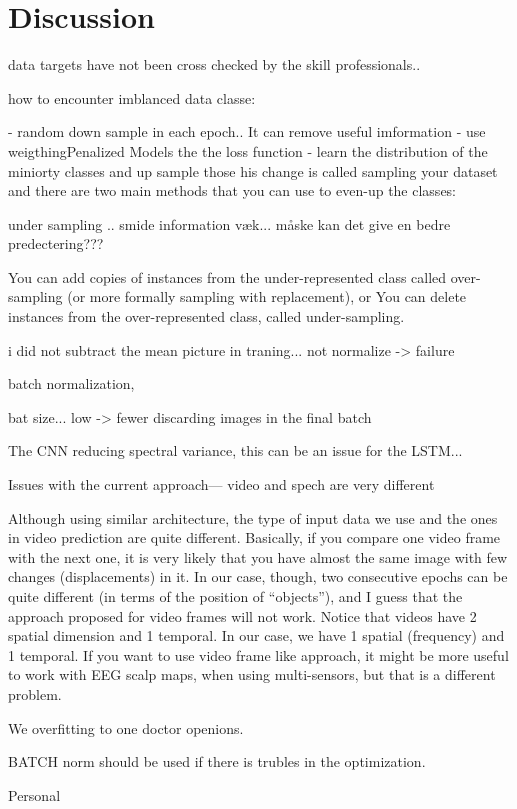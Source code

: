 \section{Discussion}
\label{sec:discussion}



data targets have not been cross checked by the skill professionals..


how to encounter imblanced data classe:

-  random down sample in each epoch.. It can remove useful imformation
- use weigthingPenalized Models the the loss function
- learn the distribution of the miniorty classes and up sample those
his change is called sampling your dataset and there are two main methods that you can use to even-up the classes:



under sampling .. smide information væk... måske kan det give en bedre predectering???




You can add copies of instances from the under-represented class called over-sampling (or more formally sampling with replacement), or
You can delete instances from the over-represented class, called under-sampling.



i did not subtract the mean picture in traning... not normalize -> failure


batch normalization,


bat size... low -> fewer discarding images in the final batch



The CNN reducing spectral variance, this can be an issue for the LSTM...


Issues with the current approach--- video and spech are very different

Although using similar architecture, the type of input data we use and the ones in video prediction are quite different. Basically, if you compare one video frame with the next one, it is very likely that you have almost the same image with few changes (displacements) in it. In our case, though, two consecutive epochs can be quite different (in terms of the position of “objects”), and I guess that the approach proposed for video frames will not work. Notice that videos have 2 spatial dimension and 1 temporal. In our case, we have 1 spatial (frequency) and 1 temporal. If you want to use video frame like approach, it might be more useful to work with EEG scalp maps, when using multi-sensors, but that is a different problem.



We overfitting to one doctor openions.


BATCH norm should be used if there is trubles in the optimization.



Personal 
